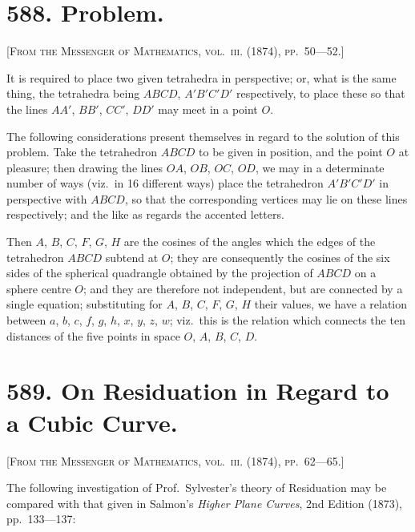 \documentclass[11pt,a4paper]{book}
\begin{document}
\newpage

\section*{588. Problem.}

\noindent\textsc{[From the Messenger of Mathematics, vol.~\textsc{iii}. (1874), pp.~50---52.]}

\medskip

\noindent It is required to place two given tetrahedra in perspective; or, what is the same thing, the tetrahedra being $ABCD$, $A'B'C'D'$ respectively, to place these so that the lines $AA'$, $BB'$, $CC'$, $DD'$ may meet in a point $O$.

The following considerations present themselves in regard to the solution of this problem. Take the tetrahedron $ABCD$ to be given in position, and the point $O$ at pleasure; then drawing the lines $OA$, $OB$, $OC$, $OD$, we may in a determinate number of ways (viz.\ in 16 different ways) place the tetrahedron $A'B'C'D'$ in perspective with $ABCD$, so that the corresponding vertices may lie on these lines respectively; and the like as regards the accented letters.

Then $A$, $B$, $C$, $F$, $G$, $H$ are the cosines of the angles which the edges of the tetrahedron $ABCD$ subtend at $O$; they are consequently the cosines of the six sides of the spherical quadrangle obtained by the projection of $ABCD$ on a sphere centre $O$; and they are therefore not independent, but are connected by a single equation; substituting for $A$, $B$, $C$, $F$, $G$, $H$ their values, we have a relation between $a$, $b$, $c$, $f$, $g$, $h$, $x$, $y$, $z$, $w$; viz.\ this is the relation which connects the ten distances of the five points in space $O$, $A$, $B$, $C$, $D$.

\newpage

\section*{589. On Residuation in Regard to a Cubic Curve.}

\noindent\textsc{[From the Messenger of Mathematics, vol.~\textsc{iii}. (1874), pp.~62---65.]}

\medskip

\noindent The following investigation of Prof.\ Sylvester's theory of Residuation may be compared with that given in Salmon's \textit{Higher Plane Curves}, 2nd Edition (1873), pp.~133---137:
\end{document}
